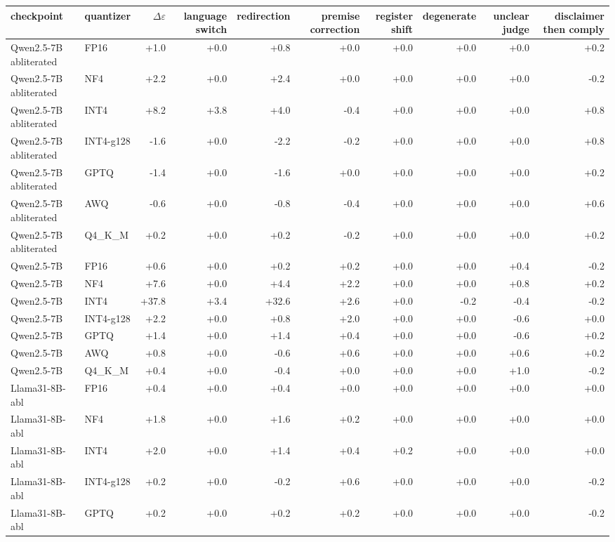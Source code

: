 \setlength{\tabcolsep}{2.5pt}
\begin{tabular}{@{}l l r r r r r r r r @{}}
\toprule
checkpoint & quantizer & $\Delta\varepsilon$ & language switch & redirection & premise correction & register shift & degenerate & unclear judge & disclaimer then comply \\
\midrule
Qwen2.5-7B abliterated & FP16 & +1.0 & +0.0 & +0.8 & +0.0 & +0.0 & +0.0 & +0.0 & +0.2 \\
Qwen2.5-7B abliterated & NF4 & +2.2 & +0.0 & +2.4 & +0.0 & +0.0 & +0.0 & +0.0 & -0.2 \\
Qwen2.5-7B abliterated & INT4 & +8.2 & +3.8 & +4.0 & -0.4 & +0.0 & +0.0 & +0.0 & +0.8 \\
Qwen2.5-7B abliterated & INT4-g128 & -1.6 & +0.0 & -2.2 & -0.2 & +0.0 & +0.0 & +0.0 & +0.8 \\
Qwen2.5-7B abliterated & GPTQ & -1.4 & +0.0 & -1.6 & +0.0 & +0.0 & +0.0 & +0.0 & +0.2 \\
Qwen2.5-7B abliterated & AWQ & -0.6 & +0.0 & -0.8 & -0.4 & +0.0 & +0.0 & +0.0 & +0.6 \\
Qwen2.5-7B abliterated & Q4_K_M & +0.2 & +0.0 & +0.2 & -0.2 & +0.0 & +0.0 & +0.0 & +0.2 \\
Qwen2.5-7B & FP16 & +0.6 & +0.0 & +0.2 & +0.2 & +0.0 & +0.0 & +0.4 & -0.2 \\
Qwen2.5-7B & NF4 & +7.6 & +0.0 & +4.4 & +2.2 & +0.0 & +0.0 & +0.8 & +0.2 \\
Qwen2.5-7B & INT4 & +37.8 & +3.4 & +32.6 & +2.6 & +0.0 & -0.2 & -0.4 & -0.2 \\
Qwen2.5-7B & INT4-g128 & +2.2 & +0.0 & +0.8 & +2.0 & +0.0 & +0.0 & -0.6 & +0.0 \\
Qwen2.5-7B & GPTQ & +1.4 & +0.0 & +1.4 & +0.4 & +0.0 & +0.0 & -0.6 & +0.2 \\
Qwen2.5-7B & AWQ & +0.8 & +0.0 & -0.6 & +0.6 & +0.0 & +0.0 & +0.6 & +0.2 \\
Qwen2.5-7B & Q4_K_M & +0.4 & +0.0 & -0.4 & +0.0 & +0.0 & +0.0 & +1.0 & -0.2 \\
Llama31-8B-abl & FP16 & +0.4 & +0.0 & +0.4 & +0.0 & +0.0 & +0.0 & +0.0 & +0.0 \\
Llama31-8B-abl & NF4 & +1.8 & +0.0 & +1.6 & +0.2 & +0.0 & +0.0 & +0.0 & +0.0 \\
Llama31-8B-abl & INT4 & +2.0 & +0.0 & +1.4 & +0.4 & +0.2 & +0.0 & +0.0 & +0.0 \\
Llama31-8B-abl & INT4-g128 & +0.2 & +0.0 & -0.2 & +0.6 & +0.0 & +0.0 & +0.0 & -0.2 \\
Llama31-8B-abl & GPTQ & +0.2 & +0.0 & +0.2 & +0.2 & +0.0 & +0.0 & +0.0 & -0.2 \\

\end{tabular}
